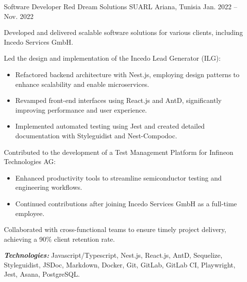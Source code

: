 \begin{cventries}
\cventry
{Software Developer } %
{Red Dream Solutions SUARL} %
{Ariana, Tunisia} %
{Jan. 2022 – Nov. 2022} %
{
  \begin{cvitems} %
    \item {Developed and delivered scalable software solutions for various clients, including Incedo Services GmbH.}
    \item {Led the design and implementation of the Incedo Lead Generator (ILG):
    \begin{itemize}
      \item{Refactored backend architecture with Nest.js, employing design patterns to enhance scalability and enable microservices.}
      \item{Revamped front-end interfaces using React.js and AntD, significantly improving performance and user experience.}
      \item{Implemented automated testing using Jest and created detailed documentation with Styleguidist and Nest-Compodoc.}
    \end{itemize}
    }
    \item {Contributed to the development of a Test Management Platform for Infineon Technologies AG:
      \begin{itemize}
        \item{Enhanced productivity tools to streamline semiconductor testing and engineering workflows.}
        \item{Continued contributions after joining Incedo Services GmbH as a full-time employee.}
      \end{itemize}
    }
    \item {Collaborated with cross-functional teams to ensure timely project delivery, achieving a 90\% client retention rate.}
   \end{cvitems}
   \vspace{5mm}
  \textbf{\textit{Technologies:}} Javascript/Typescript, Nest.js, React.js, AntD, Sequelize, Styleguidist,
   JSDoc, Markdown, Docker, Git, GitLab, GitLab CI, Playwright, Jest, Asana, PostgreSQL.
  \vspace{5mm}
}



\end{cventries}
